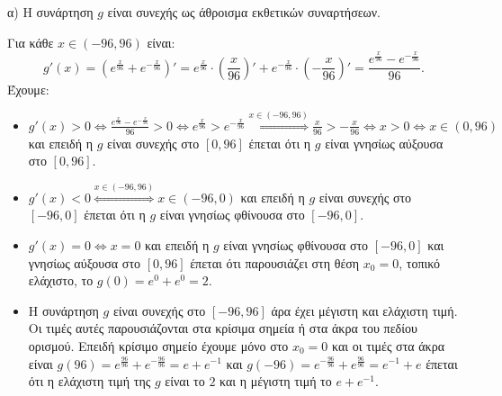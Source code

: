 α) Η συνάρτηση $g$ είναι συνεχής ως άθροισμα εκθετικών συναρτήσεων.

Για κάθε $x \in (-96,96)$ είναι:
\[ g'(x)=\left(e^{\frac{x}{96}}+e^{-\frac{x}{96}}\right)'=e^{\frac{x}{96}}\cdot \left(\frac{x}{96}\right)'+e^{-\frac{x}{96}}\cdot \left(-\frac{x}{96}\right)'=\frac{e^{\frac{x}{96}}-e^{-\frac{x}{96}}}{96}. \]
Έχουμε:
\begin{itemize}
    \item $g'(x)>0 \Leftrightarrow \frac{e^{\frac{x}{96}}-e^{-\frac{x}{96}}}{96}>0 \Leftrightarrow e^{\frac{x}{96}}>e^{-\frac{x}{96}} \overset{x\in(-96,96)}{\Longleftrightarrow} \frac{x}{96}>-\frac{x}{96} \Leftrightarrow x>0 \Leftrightarrow x \in (0,96)$ και επειδή η $g$ είναι συνεχής στο $[0,96]$ έπεται ότι η $g$ είναι γνησίως αύξουσα στο $[0,96]$.
    \item $g'(x)<0 \overset{x\in(-96,96)}{\Longleftrightarrow} x \in (-96,0)$ και επειδή η $g$ είναι συνεχής στο $[-96,0]$ έπεται ότι η $g$ είναι γνησίως φθίνουσα στο $[-96,0]$.
    \item $g'(x)=0 \Leftrightarrow x=0$ και επειδή η $g$ είναι γνησίως φθίνουσα στο $[-96,0]$ και γνησίως αύξουσα στο $[0,96]$ έπεται ότι παρουσιάζει στη θέση $x_0=0$, τοπικό ελάχιστο, το $g(0)=e^0+e^0=2$.
    \item Η συνάρτηση $g$ είναι συνεχής στο $[-96,96]$ άρα έχει μέγιστη και ελάχιστη τιμή. Οι τιμές αυτές παρουσιάζονται στα κρίσιμα σημεία ή στα άκρα του πεδίου ορισμού. Επειδή κρίσιμο σημείο έχουμε μόνο στο $x_0=0$ και οι τιμές στα άκρα είναι $g(96)=e^{\frac{96}{96}}+e^{-\frac{96}{96}}=e+e^{-1}$ και $g(-96)=e^{-\frac{96}{96}}+e^{\frac{96}{96}}=e^{-1}+e$ έπεται ότι η ελάχιστη τιμή της $g$ είναι το $2$ και η μέγιστη τιμή το $e+e^{-1}$.
\end{itemize}


